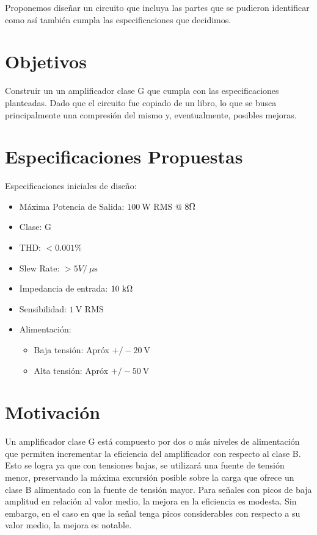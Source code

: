 \documentclass[a4paper,12pt,twoside]{article}
\newcommand{\volt}{\ensuremath{~\mathrm{V}}}
\newcommand{\kohm}{\ensuremath{~\mathrm{k}\ohm}}
\newcommand{\uS}{\ensuremath{~\mu\mathrm{s}}}
\newcommand{\watt}{\ensuremath{~\mathrm{W}}}
\begin{document}
Proponemos diseñar un circuito que incluya las partes que se pudieron identificar como así también cumpla las especificaciones que decidimos.


\newpage
\section{Objetivos}
\bigskip

Construir un un amplificador clase G que cumpla con las especificaciones planteadas. Dado que el circuito fue copiado de un libro, lo que se busca principalmente una compresión del mismo y, eventualmente, posibles mejoras.

\section{Especificaciones Propuestas} \label{sec:especificaciones}
\bigskip
Especificaciones iniciales de diseño:
\begin{itemize}
	\item Máxima Potencia de Salida:  $100\watt$ RMS @ $8\ohm$
	\item Clase: G
	\item THD: $<0.001 \%$ 
	\item Slew Rate: $>5V / \uS$
	\item Impedancia de entrada: $10\kohm$
	\item Sensibilidad: $1\volt$ RMS
	\item Alimentación: 
	\begin{itemize}
		\item Baja tensión: Apróx $ +/-20\volt$ 
		\item Alta tensión: Apróx $ +/-50\volt$
	\end{itemize}
\end{itemize}

\section{Motivación}
\bigskip

Un amplificador clase G está compuesto por dos o más niveles de alimentación que permiten incrementar la eficiencia del amplificador con respecto al clase B. Esto se logra ya que con tensiones bajas, se utilizará una fuente de tensión menor, preservando la máxima excursión posible sobre la carga que ofrece un clase B alimentado con la fuente de tensión mayor. Para señales con picos de baja amplitud en relación al valor medio, la mejora en la eficiencia es modesta. Sin embargo, en el caso en que la señal tenga picos considerables con respecto a su valor medio, la mejora es notable.
\end{document}
